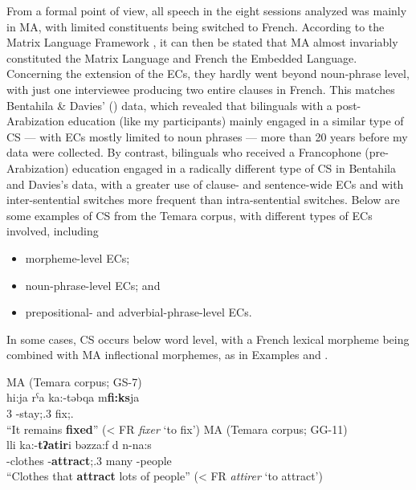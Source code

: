\documentclass[output=paper]{langscibook}
\begin{document}
From a formal point of view, all speech in the eight sessions analyzed was mainly in \gls*{MA}, with limited constituents being switched to French. According to the Matrix Language Framework \citep{myers-scotton_contact_2002}, it can then be stated that \gls*{MA} almost invariably constituted the Matrix Language and French the Embedded Language. Concerning the extension of the \glspl*{EC}, they hardly went beyond noun-phrase level, with just one interviewee producing two entire clauses in French. This matches Bentahila \& Davies' (\citeyear{bentahila_patterns_1995}) data, which revealed that bilinguals with a post-Arabization education (like my participants) mainly engaged in a similar type of \gls*{CS} — with \glspl*{EC} mostly limited to noun phrases — more than 20 years before my data were collected. By contrast, bilinguals who received a Francophone (pre-Arabization) education engaged in a radically different type of \gls*{CS} in Bentahila and Davies’s data, with a greater use of clause- and sentence-wide \glspl*{EC} and with inter-sentential switches more frequent than intra-sentential switches. Below are some examples of \gls*{CS} from the Temara corpus, with different types of \glspl*{EC} involved, including

\begin{itemize}
	\item morpheme-level \glspl*{EC};
	\item noun-phrase-level \glspl*{EC}; and
	\item prepositional- and adverbial-phrase-level \glspl*{EC}.
\end{itemize}

\noindent
In some cases, \gls*{CS} occurs below word level, with a French lexical morpheme being combined with \gls*{MA} inflectional morphemes, as in Examples  and .

\begin{exe} 
	\ex\label{falchetta:ex:1} \gls*{MA} (Temara corpus; GS-7)\footnotemark \\
	\gll 	hi:ja 		rˁa 	ka:-tǝbqa 					m\textbf{fi:ks}ja 	\\
	3\F\SG{} 	\ARG{} 	\PRVB-stay;\IPFV.3\F\SG{}	fix;\PTCP.\F{} 		\\
	\glt 	“It remains \textbf{fixed}” (< FR \textit{fixer} ‘to fix’)
	\ex\label{falchetta:ex:2} \gls*{MA} (Temara corpus; GG-11) \\
	 	lli 	ka:-\textbf{tʔatir}i 							bǝzza:f 	d 		n-na:s \\
	\INDF-clothes 			\REL{} 	\PRVB-\textbf{attract};\IPFV.3\F\SG{}			many		\GEN{}	\DEF-people \\
	\glt	“Clothes that \textbf{attract} lots of people” (< FR \textit{attirer} ‘to attract’)
\end{exe}
\end{document}
